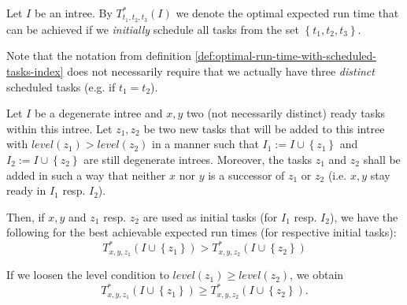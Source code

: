\begin{definition}
  \label{def:optimal-run-time-with-scheduled-tasks-index}
  Let $I$ be an intree.
  By $T^*_{t_1,t_2,t_3}(I)$ we denote the optimal expected run time that can be achieved if we \emph{initially} schedule all tasks from the set $\left\{ t_1,t_2,t_3 \right\}$.
\end{definition}

Note that the notation from definition  \ref{def:optimal-run-time-with-scheduled-tasks-index} does not necessarily require that we actually have three \emph{distinct} scheduled tasks (e.g. if $t_1=t_2$).

\begin{lemma}
  \label{lem:p3-adding-tasks-level-keep-scheduled-same-inequality}
  Let $I$ be a degenerate intree and $x, y$ two (not necessarily distinct) ready tasks within this intree. Let $z_1, z_2$ be two new tasks that will be added to this intree with $level(z_1) > level(z_2)$ in a manner such that $I_1:=I\cup\left\{ z_1 \right\}$ and $I_2:=I\cup\left\{ z_2 \right\}$ are still degenerate intrees. Moreover, the tasks $z_1$ and $z_2$ shall be added in such a way that neither $x$ nor $y$ is a successor of $z_1$ or $z_2$ (i.e. $x,y$ stay ready in $I_1$ resp. $I_2$). 

  Then, if $x,y$ and $z_1$ resp. $z_2$ are used as initial tasks (for $I_1$ resp. $I_2$), we have the following for the best achievable expected run times (for respective initial tasks):
  \begin{equation}
    \label{eq:lemma-p3-adding-tasks-level-keep-scheduled-same-inequality}
    T^{*}_{x,y,z_1}\left(I\cup\left\{ z_1 \right\}\right) > T^{*}_{x,y,z_2}\left( I\cup\left\{ z_2 \right\} \right)
  \end{equation}

  If we loosen the level condition to $level(z_1)\geq level(z_2)$, we obtain
  \begin{equation*}
    T^{*}_{x,y,z_1}\left(I\cup\left\{ z_1 \right\}\right) \geq T^{*}_{x,y,z_2}\left( I\cup\left\{ z_2 \right\} \right).
  \end{equation*}
\end{lemma}

